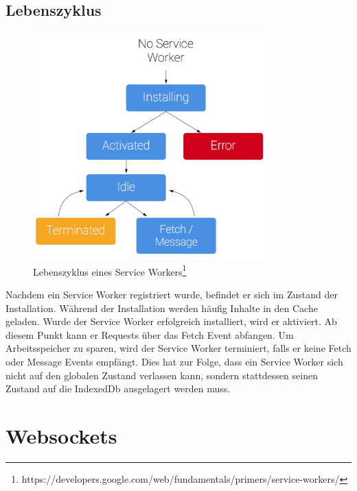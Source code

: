 \subsection{Lebenszyklus}
\begin{figure}[!h]
	\centering
	\includegraphics[width=0.8\textwidth]{figures/sw-lifecycle}
	\caption[Lebenszyklus eines Service Workers]{Lebenszyklus eines Service Workers\footnote{https://developers.google.com/web/fundamentals/primers/service-workers/}}
	\label{fig:swLifecycle}
\end{figure}
Nachdem ein Service Worker registriert wurde, befindet er sich im Zustand der Installation. Während der Installation werden häufig Inhalte in den Cache geladen. Wurde der Service Worker erfolgreich installiert, wird er aktiviert. Ab diesem Punkt kann er Requests über das Fetch Event abfangen. Um Arbeitsspeicher zu sparen, wird der Service Worker terminiert, falls er keine Fetch oder Message Events empfängt. Dies hat zur Folge, dass ein Service Worker sich nicht auf den globalen Zustand verlassen kann, sondern stattdessen seinen Zustand auf die IndexedDb ausgelagert werden muss.



%


\section{Websockets}


